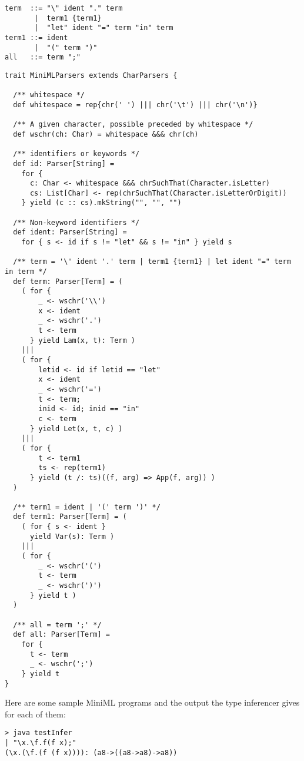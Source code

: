 \begin{itemize}
{\begin{lstlisting}
term  ::= "\" ident "." term
       |  term1 {term1}
       |  "let" ident "=" term "in" term
term1 ::= ident
       |  "(" term ")"
all   ::= term ";"
\end{lstlisting}
\begin{lstlisting}
trait MiniMLParsers extends CharParsers {

  /** whitespace */
  def whitespace = rep{chr(' ') ||| chr('\t') ||| chr('\n')}

  /** A given character, possible preceded by whitespace */
  def wschr(ch: Char) = whitespace &&& chr(ch)

  /** identifiers or keywords */
  def id: Parser[String] = 
    for {
      c: Char <- whitespace &&& chrSuchThat(Character.isLetter)
      cs: List[Char] <- rep(chrSuchThat(Character.isLetterOrDigit))
    } yield (c :: cs).mkString("", "", "")

  /** Non-keyword identifiers */
  def ident: Parser[String] =
    for { s <- id if s != "let" && s != "in" } yield s

  /** term = '\' ident '.' term | term1 {term1} | let ident "=" term in term */
  def term: Parser[Term] = (
    ( for {
        _ <- wschr('\\')
        x <- ident
        _ <- wschr('.')
        t <- term
      } yield Lam(x, t): Term )
    |||
    ( for {
        letid <- id if letid == "let"
        x <- ident
        _ <- wschr('=')
        t <- term; 
        inid <- id; inid == "in"
        c <- term
      } yield Let(x, t, c) )
    |||
    ( for {
        t <- term1
        ts <- rep(term1)
      } yield (t /: ts)((f, arg) => App(f, arg)) )
  )     

  /** term1 = ident | '(' term ')' */
  def term1: Parser[Term] = (
    ( for { s <- ident }
      yield Var(s): Term )
    |||
    ( for {
        _ <- wschr('(')
        t <- term
        _ <- wschr(')')
      } yield t )
  )

  /** all = term ';' */
  def all: Parser[Term] = 
    for {
      t <- term
      _ <- wschr(';')
    } yield t
}
\end{lstlisting}
Here are some sample MiniML programs and the output the type inferencer gives for each of them:
\begin{lstlisting}
> java testInfer
| "\x.\f.f(f x);"
(\x.(\f.(f (f x)))): (a8->((a8->a8)->a8))


\end{lstlisting}}
\end{itemize}
